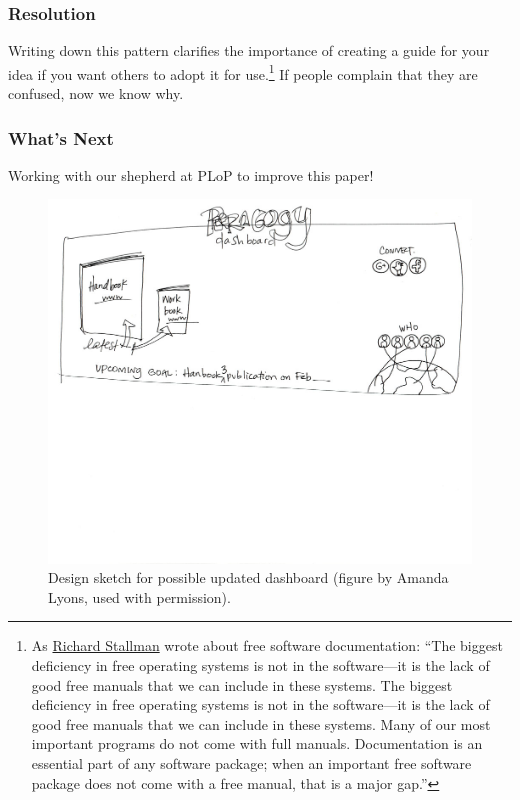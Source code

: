 \subsubsection*{Resolution}
Writing down this pattern clarifies the importance of creating a guide for your idea if you want others to adopt it for use.\footnote{As \href{https://www.gnu.org/philosophy/free-doc.html}{Richard Stallman} wrote about free software documentation: ``The biggest deficiency in free operating systems is not in the software—it is the lack of good free manuals that we can include in these systems. The biggest deficiency in free operating systems is not in the software—it is the lack of good free manuals that we can include in these systems. Many of our most important programs do not come with full manuals. Documentation is an essential part of any software package; when an important free software package does not come with a free manual, that is a major gap.''}  If people complain that they are confused, now we know why.

\subsubsection*{What's Next} 
Working with our shepherd at PLoP to improve this paper!


\begin{figure}
\includegraphics[width=\textwidth,trim=0mm 135mm 0mm 0mm,clip=true]{figures/peeragogy_dashboard_draft1/peeragogy_dashboard_draft1.jpg}
\caption{Design sketch for possible updated dashboard (figure by Amanda Lyons, used with permission).}
\end{figure}
